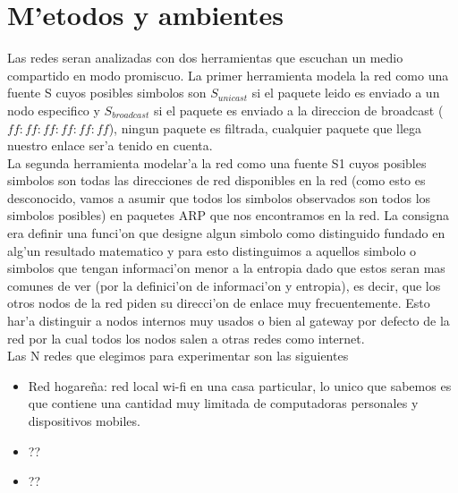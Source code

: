 \section{M'etodos y ambientes}
Las redes seran analizadas con dos herramientas que escuchan un medio compartido en modo promiscuo. La primer herramienta
 modela la red como una fuente S cuyos posibles simbolos son $S_{unicast}$ si el paquete leido es enviado
 a un nodo especifico y $S_{broadcast}$ si el paquete es enviado a la direccion de broadcast ($ff:ff:ff:ff:ff:ff$), ningun paquete
 es filtrada, cualquier paquete que llega nuestro enlace ser'a tenido en cuenta.\\
La segunda herramienta modelar'a la red como una fuente S1 cuyos posibles simbolos son todas las direcciones de red disponibles
en la red (como esto es desconocido, vamos a asumir que todos los simbolos observados son todos los simbolos posibles) en 
paquetes ARP que nos encontramos en la red. La consigna era definir una funci'on que designe algun simbolo como distinguido
fundado en alg'un resultado matematico y para esto distinguimos a aquellos simbolo o simbolos que tengan informaci'on menor a
la entropia dado que estos seran mas comunes de ver (por la definici'on de informaci'on y entropia), es decir, que los otros
nodos de la red piden su direcci'on de enlace muy frecuentemente. Esto har'a distinguir a nodos internos muy usados o bien
al gateway por defecto de la red por la cual todos los nodos salen a otras redes como internet.\\

Las N redes que elegimos para experimentar son las siguientes
\begin{itemize}
	\item Red hogare\~na: red local wi-fi en una casa particular, lo unico que sabemos es que contiene una cantidad muy
	 limitada de computadoras personales y dispositivos mobiles.
	\item ??
	\item ??
\end{itemize}

